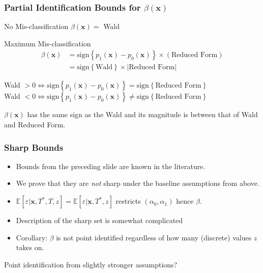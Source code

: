 \documentclass{beamer}
\begin{document}
\begin{frame}
  \frametitle{Partial Identification Bounds for $\beta(\mathbf{x})$}

    \begin{block}{No Mis-classification}
      $\beta(\mathbf{x}) = $ Wald 
    \end{block}

    \begin{block}{Maximum Mis-classification}
      \vspace{-1.5em}
      \begin{align*}
        \beta(\mathbf{x}) &=\mbox{sign}\left\{ p_1(\mathbf{x}) - p_0(\mathbf{x}) \right\}\times (\mbox{Reduced Form})\\
        &=\mbox{sign}\left\{ \mbox{Wald} \right\} \times |\mbox{Reduced Form}|
      \end{align*}
      
      \vspace{1em}
    \footnotesize Wald $> 0\iff \mbox{sign}\left\{ p_1(\mathbf{x}) - p_0(\mathbf{x}) \right\} = \mbox{sign}\left\{ \mbox{Reduced Form} \right\}$ \\
    \footnotesize Wald $< 0\iff \mbox{sign}\left\{ p_1(\mathbf{x}) - p_0(\mathbf{x}) \right\} \neq \mbox{sign}\left\{ \mbox{Reduced Form} \right\}$ 
    \end{block}

    \vspace{1em}
    \begin{alertblock}{
        $\beta(\mathbf{x})$ has the same sign as the Wald and its magnitude is between that of Wald and Reduced Form.}
    \end{alertblock}

\end{frame}
\begin{frame}[label=SHARP_BODY]
  \frametitle{Sharp Bounds}

  \begin{itemize}
    \item Bounds from the preceding slide are known in the literature.
    \item We prove that they are \emph{not} sharp under the baseline assumptions from above.
      \item $\mathbb{E}[\varepsilon|\mathbf{x},T^*,T,z] = \mathbb{E}[\varepsilon|\mathbf{x},T^*,z]$ restricts $(\alpha_0,\alpha_1)$ hence $\beta$.
    \item Description of the sharp set is somewhat complicated 
      \hyperlink{SHARP_APPEND}{}
    \item Corollary: $\beta$ is not point identified regardless of how many (discrete) values $z$ takes on.
  \end{itemize}

  \begin{alertblock}{Point identification from slightly stronger assumptions?}
  \end{alertblock}

\end{frame}
\end{document}
